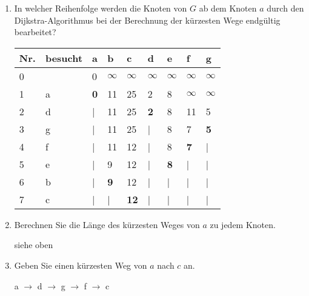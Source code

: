 \documentclass{bschlangaul-aufgabe}
\begin{document}
\begin{enumerate}

%

\item In welcher Reihenfolge werden die Knoten von $G$ ab dem Knoten $a$
durch den Dijkstra-Algorithmus bei der Berechnung der kürzesten Wege
endgültig bearbeitet?

\begin{liAntwort}
\begin{tabular}{lllllllll}
\bf{Nr.}     & \bf{besucht} & \bf{a}       & \bf{b}       & \bf{c}       & \bf{d}       & \bf{e}       & \bf{f}       & \bf{g}       \\
\hline
0            &              & 0            & $\infty$     & $\infty$     & $\infty$     & $\infty$     & $\infty$     & $\infty$     \\
1            & a            & \bf{0}       & 11           & 25           & 2            & 8            & $\infty$     & $\infty$     \\
2            & d            & |            & 11           & 25           & \bf{2}       & 8            & 11           & 5            \\
3            & g            & |            & 11           & 25           & |            & 8            & 7            & \bf{5}       \\
4            & f            & |            & 11           & 12           & |            & 8            & \bf{7}       & |            \\
5            & e            & |            & 9            & 12           & |            & \bf{8}       & |            & |            \\
6            & b            & |            & \bf{9}       & 12           & |            & |            & |            & |            \\
7            & c            & |            & |            & \bf{12}      & |            & |            & |            & |            \\
\end{tabular}
\end{liAntwort}

%

\item Berechnen Sie die Länge des kürzesten Weges von $a$ zu jedem
Knoten.

\begin{liAntwort}
siehe oben
\end{liAntwort}

%

\item Geben Sie einen kürzesten Weg von $a$ nach $c$ an.

\begin{liAntwort}
a $\rightarrow$ d $\rightarrow$ g $\rightarrow$ f $\rightarrow$ c
\end{liAntwort}
\end{enumerate}
\end{document}
